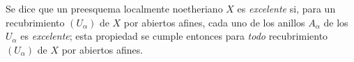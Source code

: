 \begin{env}[7.8.5]
\label{IV.2.s7.8.5-fr}
Se dice que un preesquema localmente noetheriano $X$ es \emph{excelente}
si, para un recubrimiento $(U_\alpha)$ de $X$ por abiertos afines, cada
uno de los anillos $A_\alpha$ de los $U_\alpha$ es \emph{excelente}; esta
propiedad se cumple entonces para \emph{todo} recubrimiento $(U_\alpha)$
de $X$ por abiertos afines.
\end{env}
